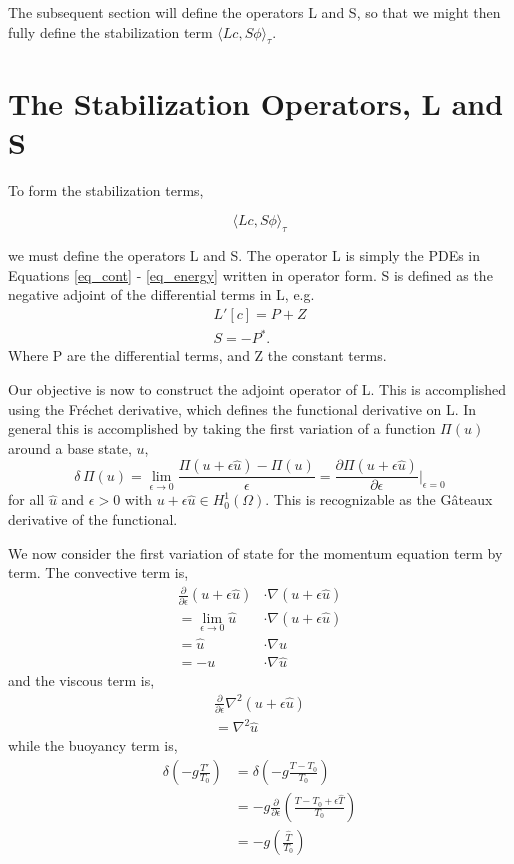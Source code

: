 The subsequent section will define the operators L and S, so that we
might then fully define the stabilization term $\langle Lc,S\phi
\rangle_\tau$. 

%
%
\section{The Stabilization Operators, L and S}


To form the stabilization terms, 

\begin{equation}
 \langle Lc,S\phi \rangle_\tau
\end{equation}

we must define the operators L and S. The operator L is simply the PDEs
in Equations \ref{eq_cont} - \ref{eq_energy} written in operator form. S is
defined as the negative adjoint of the differential terms in L, e.g.
\begin{align}
 L'[c] = P + Z \\
 S = -P^*. 
\end{align}
Where P are the differential terms, and Z the constant terms. 

Our objective is now to construct the adjoint operator of L. This is
accomplished using the Fr\'echet derivative, which defines the
functional derivative on L. In general this is accomplished by taking
the first variation of a function $\Pi(u)$ around a base state, $u$,
\begin{equation}
 \delta\, \Pi(u) = \lim_{\epsilon \to 0} \frac{\Pi(u+\epsilon \hat u) -
  \Pi(u)}{\epsilon} =
  \frac{\partial \Pi(u +\epsilon \hat u)}{\partial \epsilon}
  \bigg|_{\epsilon = 0}
\end{equation}
for all $\hat u$ and $\epsilon > 0$ with $u + \epsilon \hat u \in
H^1_0(\Omega)$. This is recognizable as the G\^{a}teaux
derivative of the functional. 

We now consider the first variation of state for the momentum equation
term by term. The convective term is, 
\begin{align}
 \frac{\partial}{\partial \epsilon} (u + \epsilon \hat u) &\cdot \nabla
  (u + \epsilon \hat u) \\
 = \lim_{\epsilon \to 0} \hat u &\cdot \nabla (u + \epsilon \hat u) \\
 = \hat u & \cdot \nabla u \\
 = - u &\cdot \nabla \hat u
\end{align}
and the viscous term is, 
\begin{align}
 \frac{\partial}{\partial \epsilon} \nabla^2 (u + \epsilon \hat u) \\
 = \nabla^2 \hat u
\end{align}
while the buoyancy term is, 
\begin{align}
 \delta \left(-g \frac{T'}{T_0}\right) &= \delta \left( -g
 \frac{T-T_0}{T_0} \right) \\
 &= -g \frac{\partial}{\partial \epsilon} \left( \frac{T-T_0+\epsilon
 \hat T}{T_0} \right) \\
 &= -g \left( \frac{\hat T}{T_0} \right) 
\end{align}


